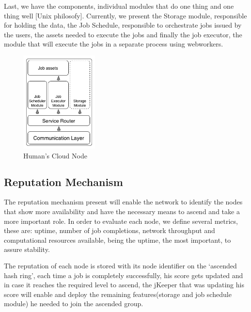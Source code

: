 \documentclass{./llncs2e/llncs}
\begin{document}
Last, we have the components, individual modules that do one thing and one thing well [Unix philosofy]. Currently, we present the Storage module, responsible for holding the data, the Job Schedule, responsible to orchestrate jobs issued by the users, the assets needed to execute the jobs and finally the job executor, the module that will execute the jobs in a separate process using webworkers.

\begin{figure}[h!]
  \centering
  \includegraphics[width=0.35\textwidth]{img/node.jpg}
  \caption{Human's Cloud Node}
  \label{fig:hcnode}
\end{figure}

\subsection{Reputation Mechanism}

The reputation mechanism present will enable the network to identify the nodes that show more availability and have the necessary means to ascend and take a more important role. In order to evaluate each node, we define several metrics, these are: uptime, number of job completions, network throughput and  computational resources available, being the uptime, the most important, to assure stability.

The reputation of each node is stored with its node identifier on the `ascended hash ring', each time a job is completely successfully, his score gets updated and in case it reaches the required level to ascend, the jKeeper that was updating his score will enable and deploy the remaining features(storage and job schedule module) he needed to join the ascended group. 


\end{document}
